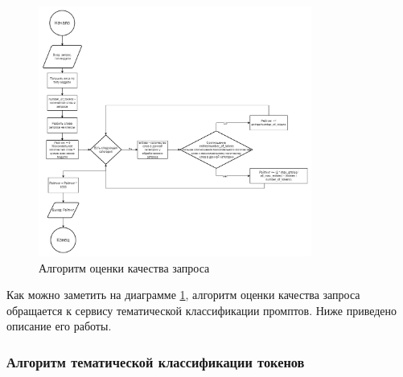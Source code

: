 \begin{figure}[htbp]
    \centering
    \includegraphics[width=0.8\textwidth]{picture/rating-algoritm.png}
    \caption{Алгоритм оценки качества запроса}
    \label{rating-algoritm}
\end{figure}

Как можно заметить на диаграмме \ref{rating-algoritm}, алгоритм оценки качества запроса обращается к сервису тематической классификации промптов.  
Ниже приведено описание его работы.

\subsubsection*{Алгоритм тематической классификации токенов}

